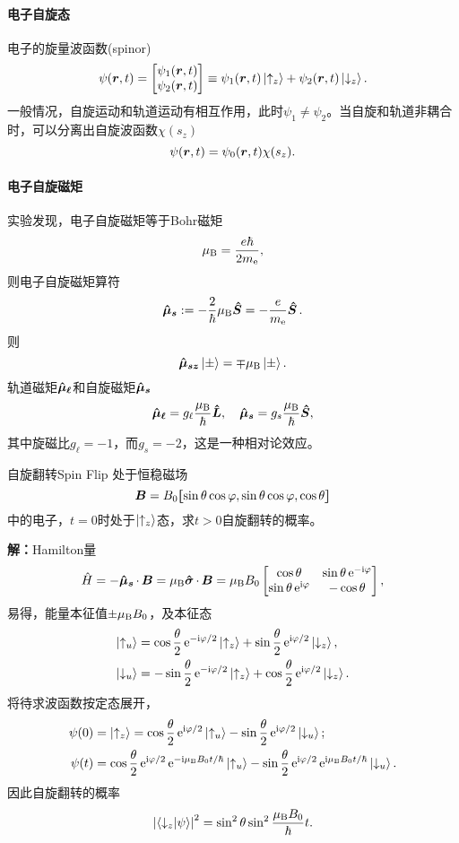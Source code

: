 \paragraph*{电子自旋态}电子的旋量波函数(spinor)
\[\psi(\r,t)=\begin{bmatrix}
	\psi_1(\r,t)\\\psi_2(\r,t)
\end{bmatrix}\equiv\psi_1(\r,t)\ket{\uparrow_z}+\psi_2(\r,t)\ket{\downarrow_z}.\]
一般情况，自旋运动和轨道运动有相互作用，此时$\psi_1\neq\psi_2$。当自旋和轨道非耦合时，可以分离出自旋波函数$\chi(s_z)$
\[\psi(\r,t)=\psi_0(\r,t)\chi(s_z).\]

\paragraph*{电子自旋磁矩}实验发现，电子自旋磁矩等于Bohr磁矩
\[\muB=\frac{e\hbar}{2m_\elc},\]
则电子自旋磁矩算符
\[\qo{\mu_s}:=-\frac2\hbar\muB\qo S=-\frac e{m_\elc}\qo S.\]
则
\[\qo{\mu_{sz}}\ket\pm=\mp\muB\ket\pm.\]
轨道磁矩$\qo{\mu_\ell}$和自旋磁矩$\qo{\mu_s}$
\[\qo{\mu_\ell}=g_\ell\frac\muB\hbar\qo L,\quad\qo{\mu_s}=g_s\frac\muB\hbar\qo S,\]
其中旋磁比$g_\ell=-1$，而$g_s=-2$，这是一种相对论效应。
\begin{example}{自旋翻转}{Spin Flip}
	处于恒稳磁场
	\[\bm B=B_0\zkh{\sin\theta\cos\vf,\sin\ct\cos\vf,\cos\ct}\]
	中的电子，$t=0$时处于$\ket{\uparrow_z}$态，求$t>0$自旋翻转的概率。
	
	\textbf{解：}\quad Hamilton量
	\[\hat H=-\qo{\mu_s}\cdot\,\bm B=\muB\qo\sigma\cdot\,\bm B=\muB B_0\begin{bmatrix}
		\cos\ct&\sin\ct\e{-\i\vf}\\\sin\ct\e{\i\vf}&-\cos\ct
	\end{bmatrix},\]
	易得，能量本征值$\pm\muB B_0$，及本征态
	\begin{align*}
		\ket{\uparrow_u}&=\cos\frac\ct{2}\e{-\i\vf/2}\ket{\uparrow_z}+\sin\frac\ct{2}\e{\i\vf/2}\ket{\downarrow_z},\\
		\ket{\downarrow_u}&=-\sin\frac\ct{2}\e{-\i\vf/2}\ket{\uparrow_z}+\cos\frac\ct{2}\e{\i\vf/2}\ket{\downarrow_z}.
	\end{align*}
	将待求波函数按定态展开，
	\begin{align*}
		\psi(0)&=\ket{\uparrow_z}=\cos\frac\ct{2}\e{\i\vf/2}\ket{\uparrow_u}-\sin\frac\theta{2}\e{\i\vf/2}\ket{\downarrow_u};\\
		\psi(t)&=\cos\frac\ct{2}\e{\i\vf/2}\e{-\i\muB B_0t/\hbar}\ket{\uparrow_u}-\sin\frac\theta{2}\e{\i\vf/2}\e{\i\muB B_0t/\hbar}\ket{\downarrow_u}.
	\end{align*}
	因此自旋翻转的概率
	\[\abs{\brkt{\downarrow_z}{\psi}}^2=\sin^2\theta\sin^2\frac{\muB B_0}\hbar t.\]
\end{example}
